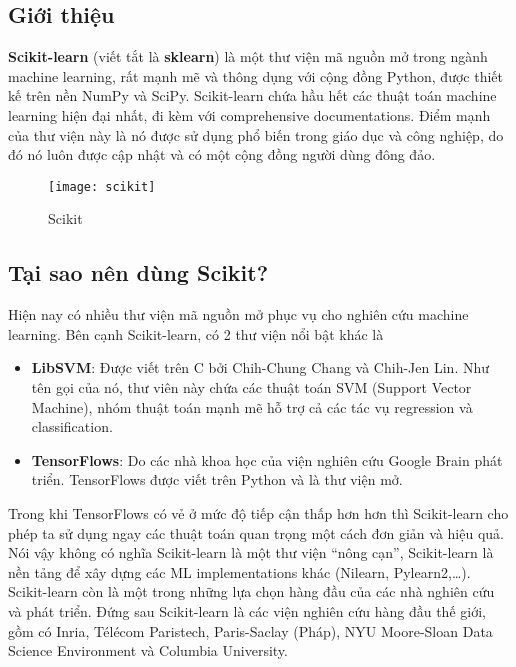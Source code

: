 \subsection{Giới thiệu}
\textbf{Scikit-learn} (viết tắt là \textbf{sklearn}) là một thư viện mã nguồn mở trong ngành machine learning, 
rất mạnh mẽ và thông dụng với cộng đồng Python, được thiết kế trên nền NumPy và SciPy. 
Scikit-learn chứa hầu hết các thuật toán machine learning hiện đại nhất, 
đi kèm với comprehensive documentations. Điểm mạnh của thư viện này là nó được sử dụng phổ biến trong giáo dục và công nghiệp, 
do đó nó luôn được cập nhật và có một cộng đồng người dùng đông đảo.
\begin{figure}[!htbp]
    \centering
    \texttt{[image: scikit]}
    \caption{Scikit}
    \label{fig:x cubed graph}
\end{figure}
\FloatBarrier
\subsection{Tại sao nên dùng Scikit?}
Hiện nay có nhiều thư viện mã nguồn mở phục vụ cho nghiên cứu machine learning. Bên cạnh Scikit-learn, có 2 thư viện nổi bật khác là
\begin{itemize}
    \item \textbf{LibSVM}: Được viết trên C bởi Chih-Chung Chang và Chih-Jen Lin. Như tên gọi của nó, thư viên này chứa các thuật toán SVM (Support Vector Machine), nhóm thuật toán mạnh mẽ hỗ trợ cả các tác vụ regression và classification.
    \item \textbf{TensorFlows}: Do các nhà khoa học của viện nghiên cứu Google Brain phát triển. TensorFlows được viết trên Python và là thư viện mở.
\end{itemize}
Trong khi TensorFlows có vẻ ở mức độ tiếp cận thấp hơn hơn thì Scikit-learn cho phép ta sử dụng ngay các thuật toán quan trọng một cách đơn giản và hiệu quả. 
Nói vậy không có nghĩa Scikit-learn là một thư viện “nông cạn”, Scikit-learn là nền tảng để xây dựng các ML implementations khác (Nilearn, Pylearn2,…). 
Scikit-learn còn là một trong những lựa chọn hàng đầu của các nhà nghiên cứu và phát triển. Đứng sau Scikit-learn là các viện nghiên cứu hàng đầu thế giới, gồm có Inria, Télécom Paristech, Paris-Saclay (Pháp), NYU Moore-Sloan Data Science Environment và Columbia University.